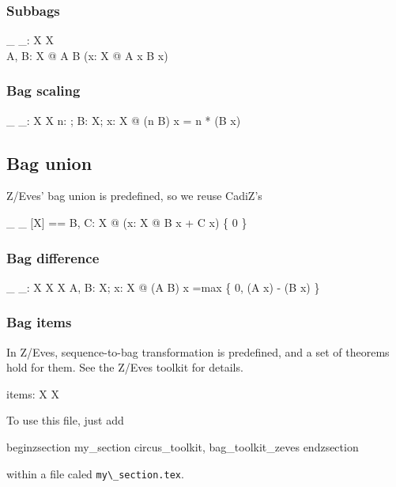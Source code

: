 \documentclass[draft,a4paper,10pt,wd]{article}
\begin{document}
\subsubsection*{Subbags}

\begin{gendef}[X]
  \_ \subbageq \_: \bag X \rel \bag X \\
\where
  \forall A, B: \bag X @ A \subbageq B \iff
	(\forall x: X @ A \bcount x \leq B \bcount x)
\end{gendef}

\subsubsection*{Bag scaling}

\begin{gendef}[X]
  \_ \otimes \_: \nat \cross \bag X \fun \bag X
\where
  \forall n: \nat; B: \bag X; x: X @
     (n \otimes B) \bcount x = n * (B \bcount x)
\end{gendef}

\subsection*{Bag union }

Z/Eves' bag union is predefined, so we reuse CadiZ's
\begin{zed}
\_ \uplus \_ [X] == \lambda B, C: \bag X @ (\lambda x: X @ B \bcount x + C \bcount x) \nrres \{ 0 \}
\end{zed}

\subsubsection*{Bag difference}

\begin{gendef}[X]
  \_ \uminus \_: \bag X \cross \bag X \fun \bag X
\where
  \forall A, B: \bag X; x: X @
     (A \uminus B) \bcount x =max \{ 0, (A \bcount x) - (B \bcount x) \}
\end{gendef}

\subsubsection*{Bag items}

In Z/Eves, sequence-to-bag transformation is predefined, and a set
of theorems hold for them. See the Z/Eves toolkit for details.
%
\begin{gendef}[X]
  items: \seq X \fun \bag X
\end{gendef}

To use this file, just add  

begin{zsection}
\SECTION my\_section \parents circus\_toolkit, bag\_toolkit\_zeves
end{zsection}

within a file caled \verb'my\_section.tex'.
\end{document}
